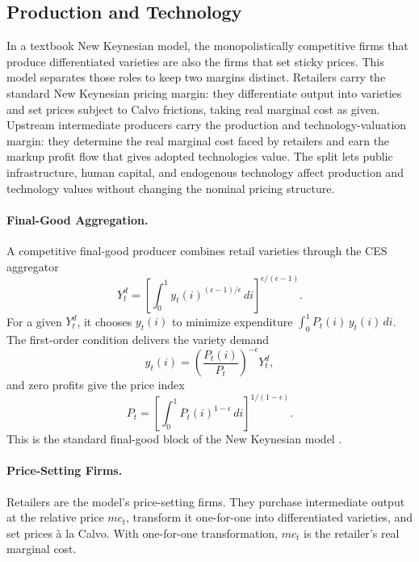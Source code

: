 \documentclass[a4paper,11pt]{article}
\begin{document}
\subsection{Production and Technology}

In a textbook New Keynesian model, the monopolistically competitive firms that produce differentiated varieties are also the firms that set sticky prices.
This model separates those roles to keep two margins distinct.
Retailers carry the standard New Keynesian pricing margin: they differentiate output into varieties and set prices subject to Calvo frictions, taking real marginal cost as given.
Upstream intermediate producers carry the production and technology-valuation margin: they determine the real marginal cost faced by retailers and earn the markup profit flow that gives adopted technologies value.
The split lets public infrastructure, human capital, and endogenous technology affect production and technology values without changing the nominal pricing structure.

\paragraph{Final-Good Aggregation.}
A competitive final-good producer combines retail varieties through the CES aggregator
\[
    Y_t^{d} = \left[\int_0^1 y_t(i)^{(\epsilon-1)/\epsilon}\, di\right]^{\epsilon/(\epsilon-1)}.
\]
For a given $Y_t^{d}$, it chooses $y_t(i)$ to minimize expenditure $\int_0^1 P_t(i)\, y_t(i)\, di$.
The first-order condition delivers the variety demand
\[
    y_t(i) = \left(\frac{P_t(i)}{P_t}\right)^{-\epsilon} Y_t^{d},
\]
and zero profits give the price index
\[
    P_t = \left[\int_0^1 P_t(i)^{1-\epsilon}\, di\right]^{1/(1-\epsilon)}.
\]
This is the standard final-good block of the New Keynesian model \citep{gali2015}.

\paragraph{Price-Setting Firms.}
Retailers are the model's price-setting firms.
They purchase intermediate output at the relative price $mc_t$, transform it one-for-one into differentiated varieties, and set prices \`a la Calvo.
With one-for-one transformation, $mc_t$ is the retailer's real marginal cost.
\end{document}
